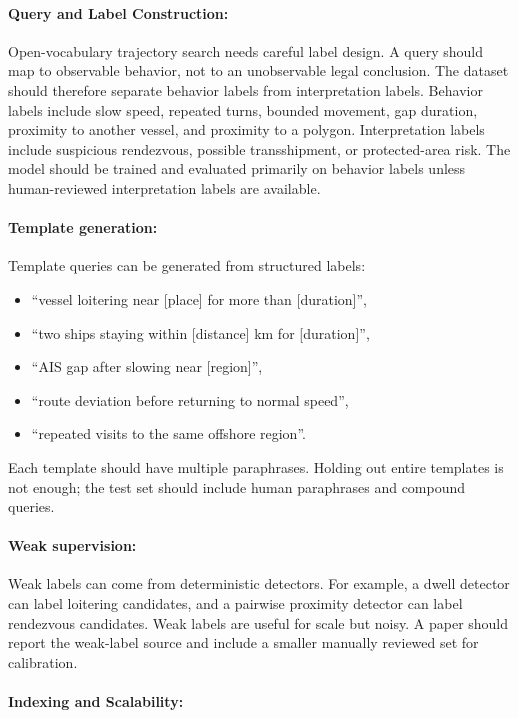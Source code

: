 \documentclass{article}
\begin{document}
\paragraph{Query and Label Construction:}

Open-vocabulary trajectory search needs careful label design. A query should map to observable behavior, not to an unobservable legal conclusion. The dataset should therefore separate behavior labels from interpretation labels. Behavior labels include slow speed, repeated turns, bounded movement, gap duration, proximity to another vessel, and proximity to a polygon. Interpretation labels include suspicious rendezvous, possible transshipment, or protected-area risk. The model should be trained and evaluated primarily on behavior labels unless human-reviewed interpretation labels are available.

\paragraph{Template generation:}

Template queries can be generated from structured labels:
\begin{itemize}
  \item ``vessel loitering near [place] for more than [duration]'',
  \item ``two ships staying within [distance] km for [duration]'',
  \item ``AIS gap after slowing near [region]'',
  \item ``route deviation before returning to normal speed'',
  \item ``repeated visits to the same offshore region''.
\end{itemize}
Each template should have multiple paraphrases. Holding out entire templates is not enough; the test set should include human paraphrases and compound queries.

\paragraph{Weak supervision:}

Weak labels can come from deterministic detectors. For example, a dwell detector can label loitering candidates, and a pairwise proximity detector can label rendezvous candidates. Weak labels are useful for scale but noisy. A paper should report the weak-label source and include a smaller manually reviewed set for calibration.

\paragraph{Indexing and Scalability:}
\end{document}
